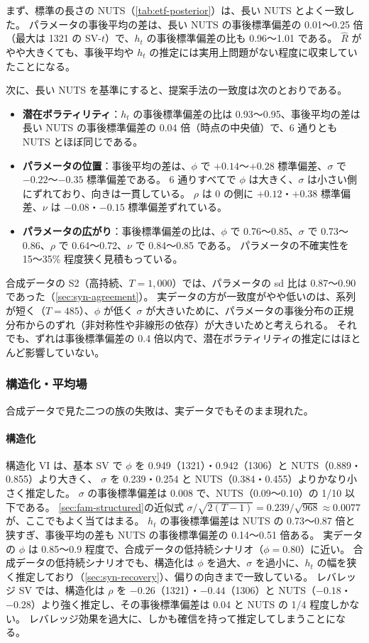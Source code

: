 まず、標準の長さの NUTS（\cref{tab:etf-posterior}）は、長い NUTS とよく一致した。
パラメータの事後平均の差は、長い NUTS の事後標準偏差の 0.01〜0.25 倍（最大は 1321 の SV-$t$）で、$h_t$ の事後標準偏差の比も 0.96〜1.01 である。
$\hat R$ がやや大きくても、事後平均や $h_t$ の推定には実用上問題がない程度に収束していたことになる。

次に、長い NUTS を基準にすると、提案手法の一致度は次のとおりである。
\begin{itemize}
  \item \textbf{潜在ボラティリティ}：$h_t$ の事後標準偏差の比は 0.93〜0.95、事後平均の差は長い NUTS の事後標準偏差の 0.04 倍（時点の中央値）で、6 通りとも NUTS とほぼ同じである。
  \item \textbf{パラメータの位置}：事後平均の差は、$\phi$ で $+0.14$〜$+0.28$ 標準偏差、$\sigma$ で $-0.22$〜$-0.35$ 標準偏差である。
    6 通りすべてで $\phi$ は大きく、$\sigma$ は小さい側にずれており、向きは一貫している。
    $\rho$ は 0 の側に $+0.12$・$+0.38$ 標準偏差、$\nu$ は $-0.08$・$-0.15$ 標準偏差ずれている。
  \item \textbf{パラメータの広がり}：事後標準偏差の比は、$\phi$ で 0.76〜0.85、$\sigma$ で 0.73〜0.86、$\rho$ で 0.64〜0.72、$\nu$ で 0.84〜0.85 である。
    パラメータの不確実性を 15〜35\% 程度狭く見積もっている。
\end{itemize}
合成データの S2（高持続、$T = 1{,}000$）では、パラメータの sd 比は 0.87〜0.90 であった（\cref{sec:syn-agreement}）。
実データの方が一致度がやや低いのは、系列が短く（$T = 485$）、$\phi$ が低く $\sigma$ が大きいために、パラメータの事後分布の正規分布からのずれ（非対称性や非線形の依存）が大きいためと考えられる。
それでも、ずれは事後標準偏差の 0.4 倍以内で、潜在ボラティリティの推定にはほとんど影響していない。

\subsubsection{構造化・平均場}

合成データで見た二つの族の失敗は、実データでもそのまま現れた。

\paragraph{構造化}
構造化 VI は、基本 SV で $\phi$ を 0.949（1321）・0.942（1306）と NUTS（0.889・0.855）より大きく、
$\sigma$ を 0.239・0.254 と NUTS（0.384・0.455）よりかなり小さく推定した。
$\sigma$ の事後標準偏差は 0.008 で、NUTS（0.09〜0.10）の 1/10 以下である。
\cref{sec:fam-structured}の近似式 $\sigma / \sqrt{2(T-1)} = 0.239 / \sqrt{968} \approx 0.0077$ が、ここでもよく当てはまる。
$h_t$ の事後標準偏差は NUTS の 0.73〜0.87 倍と狭すぎ、事後平均の差も NUTS の事後標準偏差の 0.14〜0.51 倍ある。
実データの $\phi$ は 0.85〜0.9 程度で、合成データの低持続シナリオ（$\phi = 0.80$）に近い。
合成データの低持続シナリオでも、構造化は $\phi$ を過大、$\sigma$ を過小に、$h_t$ の幅を狭く推定しており（\cref{sec:syn-recovery}）、偏りの向きまで一致している。
レバレッジ SV では、構造化は $\rho$ を $-0.26$（1321）・$-0.44$（1306）と NUTS（$-0.18$・$-0.28$）より強く推定し、その事後標準偏差は 0.04 と NUTS の 1/4 程度しかない。
レバレッジ効果を過大に、しかも確信を持って推定してしまうことになる。

